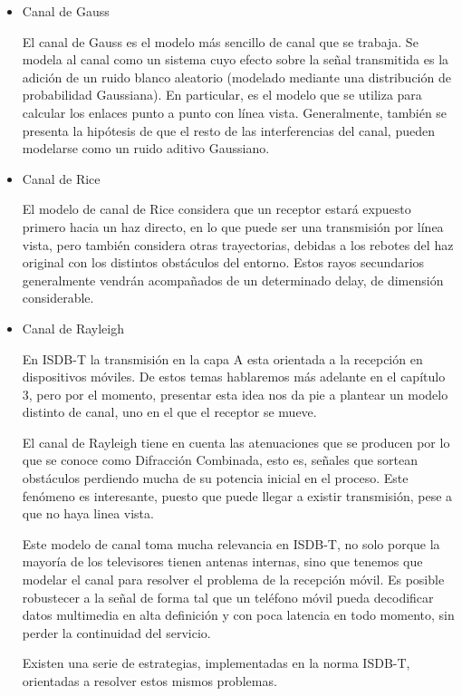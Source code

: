 \begin{itemize}
	\item Canal de Gauss
	
El canal de Gauss es el modelo más sencillo de canal que se trabaja. Se modela al canal como un sistema cuyo efecto sobre la señal transmitida es la adición de un ruido blanco aleatorio (modelado mediante una distribución de probabilidad Gaussiana). En particular, es el modelo que se utiliza para calcular los enlaces punto a punto con línea vista. Generalmente, también se presenta la hipótesis de que el resto de las interferencias del canal, pueden modelarse como un ruido aditivo Gaussiano.
	
	\item Canal de Rice

El modelo de canal de Rice considera que un receptor estará expuesto primero hacia un haz directo, en lo que puede ser una transmisión por línea vista, pero también considera otras trayectorias, debidas a los rebotes del haz original con los distintos obstáculos del entorno. Estos rayos secundarios generalmente vendrán acompañados de un determinado delay, de dimensión considerable.

	\item Canal de Rayleigh

En ISDB-T la transmisión en la capa A esta orientada a la recepción en dispositivos móviles. De estos temas hablaremos más adelante en el capítulo 3, pero por el momento, presentar esta idea nos da pie a plantear un modelo distinto de canal, uno en el que el receptor se mueve. 

El canal de Rayleigh tiene en cuenta las atenuaciones que se producen por lo que se conoce como Difracción Combinada, esto es, señales que sortean obstáculos perdiendo mucha de su potencia inicial en el proceso. Este fenómeno es interesante, puesto que puede llegar a existir transmisión, pese a que no haya linea vista. 

Este modelo de canal toma mucha relevancia en ISDB-T, no solo porque la mayoría de los televisores tienen antenas internas, sino que tenemos que modelar el canal para resolver el problema de la recepción móvil. Es posible robustecer a la señal de forma tal que un teléfono móvil pueda decodificar datos multimedia en alta definición y con poca latencia en todo momento, sin perder la continuidad del servicio. 

Existen una serie de estrategias, implementadas en la norma ISDB-T, orientadas a resolver estos mismos problemas.

\end{itemize}

